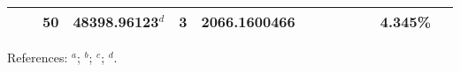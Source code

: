 \begin{table*}
\begin{center}
{\begin{tabular}{:l;l;c;l;c;l;c;l;l;c;c;c;c}
\rowstyle{\itshape}               &        & 50        & 48398.96123$^{d}$                & 3 &  2066.1600466      &      & $                                        $ & $                                        $ & $      $ &              & 4.345\%   & $     ^{}     $\\
\hline
\end{tabular}
}
{\footnotesize References:
$^{a}$\citet{Aldenius:2009:014008};
$^{b}$\citet{Pickering:2000:163};
$^{c}$\citet{Nave:2012:1570};
$^{d}$\citet{Berengut:2011:052520}.}
\end{center}
\end{table*}
